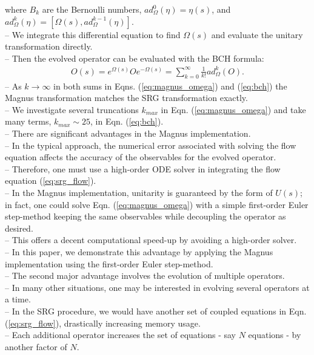 \documentclass[preprintnumbers,floatfix,aps,prc,preprint,nofootinbib]{revtex4-1}
\begin{document}
%
where $B_k$ are the Bernoulli numbers, $ad_{\Omega}^{0}(\eta)=\eta(s)$, and $ad_{\Omega}^{k}(\eta)=[\Omega(s),ad_{\Omega}^{k-1}(\eta)]$.
\\
-- We integrate this differential equation to find $\Omega(s)$ and evaluate the unitary transformation directly.
\\
-- Then the evolved operator can be evaluated with the BCH formula:
%
\begin{eqnarray}
	\label{eq:bch}
	O(s) = e^{\Omega(s)} O e^{-\Omega(s)} = \sum_{k=0}^{\infty} \frac{1}{k!} ad_{\Omega}^{k}(O).
\end{eqnarray}
%
-- As $k \rightarrow \infty$ in both sums in Eqns. (\ref{eq:magnus_omega}) and (\ref{eq:bch}) the Magnus transformation matches the SRG transformation exactly.
\\
-- We investigate several truncations $k_{max}$ in Eqn. (\ref{eq:magnus_omega}) and take many terms, $k_{max} \sim 25$, in Eqn. (\ref{eq:bch}).
\\
-- There are significant advantages in the Magnus implementation.
\\
-- In the typical approach, the numerical error associated with solving the flow equation affects the accuracy of the observables for the evolved operator.
\\
-- Therefore, one must use a high-order ODE solver in integrating the flow equation (\ref{eq:srg_flow}).
\\
-- In the Magnus implementation, unitarity is guaranteed by the form of $U(s)$; in fact, one could solve Eqn. (\ref{eq:magnus_omega}) with a simple first-order Euler step-method keeping the same observables while decoupling the operator as desired.
\\
-- This offers a decent computational speed-up by avoiding a high-order solver.
\\
-- In this paper, we demonstrate this advantage by applying the Magnus implementation using the first-order Euler step-method.
\\
-- The second major advantage involves the evolution of multiple operators.
\\
-- In many other situations, one may be interested in evolving several operators at a time.
\\
-- In the SRG procedure, we would have another set of coupled equations in Eqn. (\ref{eq:srg_flow}), drastically increasing memory usage.
\\
-- Each additional operator increases the set of equations - say $N$ equations - by another factor of $N$.
\end{document}
